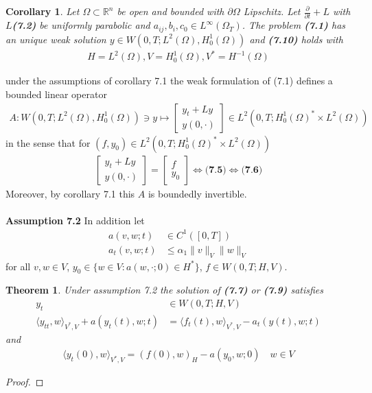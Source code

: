 \documentclass[a4paper,11pt,fleqn]{book}
\newtheorem{theorem}{Theorem}[section]
\newtheorem{corollary}{Corollary}[theorem]
\theoremstyle{definition}
\theoremstyle{remark}
\begin{document}
\begin{corollary}
	Let $\Omega \subset \mathbb{R}^n$ be open and bounded with $\partial\Omega$ Lipschitz. Let $\frac{\partial}{\partial t} + L$ with $L$\textbf{(7.2)} be uniformly parabolic and $a_{ij}, b_i, c_0 \in L^\infty(\Omega_T)$. The problem \textbf{(7.1)} has an unique weak solution $y \in W(0, T; L^2(\Omega), H_0^1(\Omega))$ and \textbf{(7.10)} holds with
	\begin{align*}
		H = L^2(\Omega), V = H_0^1(\Omega), V^* = H^{-1}(\Omega)
	\end{align*}
\end{corollary}

under the assumptions of corollary 7.1 the weak formulation of (7.1) defines a bounded linear operator 
\begin{align*}
	A: W(0, T; L^2(\Omega), H^1_0(\Omega)) \ni y \mapsto 
	\begin{bmatrix}
		y_t + Ly \\
		y(0, \cdot )
	\end{bmatrix}
	\in L^2(0, T; H^1_0(\Omega)^* \times L^2(\Omega))
\end{align*}
in the sense that for $(f, y_0) \in L^2(0, T; H^1_0(\Omega)^* \times L^2(\Omega))$
\begin{align*}
	\begin{bmatrix}
		y_t + Ly \\
		y(0, \cdot)
	\end{bmatrix}
	= 
	\begin{bmatrix}
		f\\
		y_0
	\end{bmatrix}
	\Leftrightarrow
	\textbf{(7.5)}
	\Leftrightarrow
	\textbf{(7.6)}
\end{align*}
Moreover, by corollary 7.1 this $A$ is boundedly invertible. \\
\quad\\
\textbf{Assumption 7.2} In addition let 
\begin{align*}
	a(v, w; t) &\in C^1([0, T])\\ 
	a_t (v, w ; t) &\le \alpha_1\|v\|_V\|w\|_V
\end{align*}
for all $v, w \in V$, $y_0 \in \{w \in V: a(w, \cdot; 0) \in H^* \}$, $f \in W(0, T; H, V)$. 

\begin{theorem}
	Under assumption 7.2 the solution of \textbf{(7.7)} or \textbf{(7.9)} satisfies 
	\begin{align*}
		y_t &\in W(0, T; H, V) \\
		\langle y_{tt}, w \rangle_{V^*, V} + a(y_t(t), w; t) &= \langle f_t(t), w \rangle_{V^*, V} - a_t(y(t), w; t)
	\end{align*}
	and 
	\begin{align*}
		\langle y_t(0), w \rangle_{V^*, V} = (f(0), w )_H - a(y_0, w; 0) \quad w \in V
	\end{align*}
\end{theorem}
\begin{proof}
\end{proof}
\end{document}
